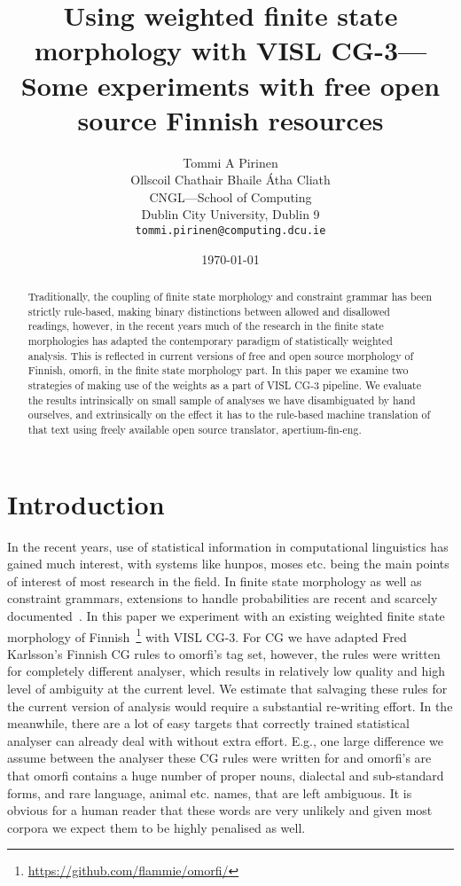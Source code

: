 \documentclass[11pt]{article}
\title{Using weighted finite state morphology with VISL CG-3---Some experiments
    with free open source Finnish resources}
\author{Tommi A Pirinen\\
Ollscoil Chathair Bhaile Átha Cliath\\
CNGL---School of Computing\\
Dublin City University, Dublin 9\\
{\tt tommi.pirinen@computing.dcu.ie}
}
\date{\today}
\begin{document}
\maketitle
\begin{abstract}
    Traditionally, the coupling of finite state morphology and constraint
    grammar has been strictly  rule-based, making binary distinctions
    between allowed and disallowed readings, however, in the recent years much
    of the research in the finite state morphologies has adapted the
    contemporary paradigm of statistically weighted analysis. This is reflected
    in current versions of free and open source morphology of Finnish, omorfi, in
    the finite state morphology part. In this paper we examine two strategies
    of making use of the weights as a part of VISL CG-3 pipeline.
    We evaluate the results intrinsically on small sample of analyses we
    have disambiguated by hand ourselves, and extrinsically on the effect it
    has to the rule-based machine translation of that text using freely
    available open source translator, apertium-fin-eng. 
\end{abstract}

\section{Introduction}

In the recent years, use of statistical information in computational
linguistics has gained much interest, with systems like hunpos, moses etc.
being the main points of interest of most research in the field. In finite
state morphology as well as constraint grammars, extensions to handle
probabilities are recent and scarcely
documented~\cite{pirinen2009weighting,bick2009introducing}.  In this paper we
experiment with an existing weighted finite state morphology of
Finnish~\cite{pirinen2011modularisation}\footnote{\url{https://github.com/flammie/omorfi/}}
with VISL CG-3. For CG we have adapted Fred Karlsson's Finnish CG rules to
omorfi's tag set, however, the rules were written for completely different
analyser, which results in relatively low quality and high level of ambiguity
at the current level. We estimate that salvaging these rules for the current
version of analysis would require a substantial re-writing effort. In the
meanwhile, there are a lot of easy targets that correctly trained statistical
analyser can already deal with without extra effort. E.g., one large 
difference we assume between the analyser these CG rules were written for and
omorfi's are that omorfi contains a huge number of proper nouns, dialectal
and sub-standard forms, and rare language, animal etc. names, that are left
ambiguous. It is obvious for a human reader that these words are very
unlikely and given most corpora we expect them to be highly penalised as
well.
\end{document}
